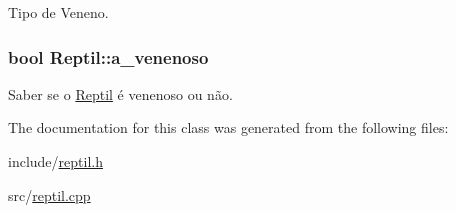 Tipo de Veneno. 

\subsubsection[{\texorpdfstring{a\+\_\+venenoso}{a_venenoso}}]{\setlength{\rightskip}{0pt plus 5cm}bool Reptil\+::a\+\_\+venenoso\hspace{0.3cm}{\ttfamily [protected]}}\hypertarget{classReptil_ab2ebc4cb4f0cf56587b59fdb0d130cf5}{}\label{classReptil_ab2ebc4cb4f0cf56587b59fdb0d130cf5}


Saber se o \hyperlink{classReptil}{Reptil} é venenoso ou não. 



The documentation for this class was generated from the following files\+:\begin{DoxyCompactItemize}
\item 
include/\hyperlink{reptil_8h}{reptil.\+h}\item 
src/\hyperlink{reptil_8cpp}{reptil.\+cpp}\end{DoxyCompactItemize}
